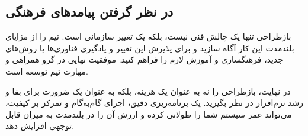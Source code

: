 \subsection{در نظر گرفتن پیامدهای فرهنگی}
بازطراحی تنها یک چالش فنی نیست، بلکه یک تغییر سازمانی است. تیم را از مزایای بلندمدت این کار آگاه سازید و برای پذیرش این تغییر و یادگیری فناوری‌ها یا روش‌های جدید، فرهنگسازی و آموزش لازم را فراهم کنید. موفقیت نهایی در گرو همراهی و مهارت تیم توسعه است.

در نهایت، بازطراحی را نه به عنوان یک هزینه، بلکه به عنوان یک ضرورت برای بقا و رشد نرم‌افزار در نظر بگیرید. یک برنامه‌ریزی دقیق، اجرای گام‌به‌گام و تمرکز بر کیفیت، می‌تواند عمر سیستم شما را طولانی کرده و ارزش آن را در بلندمدت به میزان قابل توجهی افزایش دهد.

